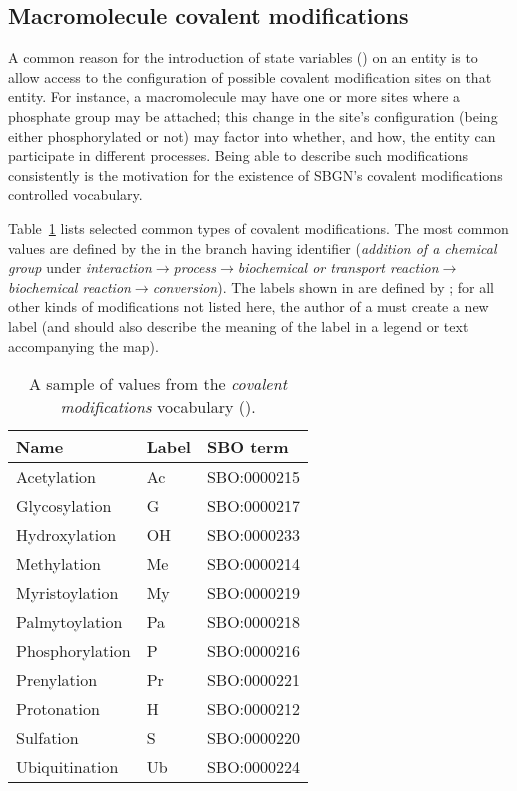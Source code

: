 \subsection{Macromolecule covalent modifications}
\label{sec:covalent-mod-cv}

A common reason for the introduction of state variables () on an entity is to allow access to the configuration of possible covalent modification sites on that entity.  For instance, a macromolecule may have one or more sites where a phosphate group may be attached; this change in the site's configuration (\ie being either phosphorylated or not) may factor into whether, and how, the entity can participate in different processes.  Being able to describe such modifications consistently is the motivation for the existence of SBGN's covalent modifications controlled vocabulary.

Table~\ref{tab:covalent-mod-cv} lists selected common types of covalent modifications.
The most common values are defined by the \sbo in the branch having identifier  (\emph{addition of a chemical group} under \emph{interaction}$\rightarrow$\emph{process}$\rightarrow$\emph{biochemical or transport reaction}$\rightarrow$\emph{biochemical reaction}$\rightarrow$\emph{conversion}).  The labels shown in  are defined by \SBGNPDLone; for all other kinds of modifications not listed here, the author of a \PD must create a new label (and should also describe the meaning of the label in a legend or text accompanying the map).

\begin{table}[h]
  \centering
  \begin{tabular}{l>{\ttfamily}l>{\ttfamily}l}
    \toprule
    \textbf{Name}   & \textbf{\rmfamily Label} & \textbf{\rmfamily SBO term} \\
    \midrule
    Acetylation     & Ac    & SBO:0000215\\
    Glycosylation   & G     & SBO:0000217\\
    Hydroxylation   & OH    & SBO:0000233\\
    Methylation     & Me    & SBO:0000214\\
    Myristoylation  & My    & SBO:0000219\\
    Palmytoylation  & Pa    & SBO:0000218\\
    Phosphorylation & P     & SBO:0000216\\
    Prenylation     & Pr    & SBO:0000221\\
    Protonation     & H     & SBO:0000212\\
    Sulfation       & S     & SBO:0000220\\
    Ubiquitination  & Ub    & SBO:0000224\\
    \bottomrule
  \end{tabular}
  \caption{A sample of values from the \emph{covalent modifications} vocabulary
    ().}
  \label{tab:covalent-mod-cv}
\end{table}

